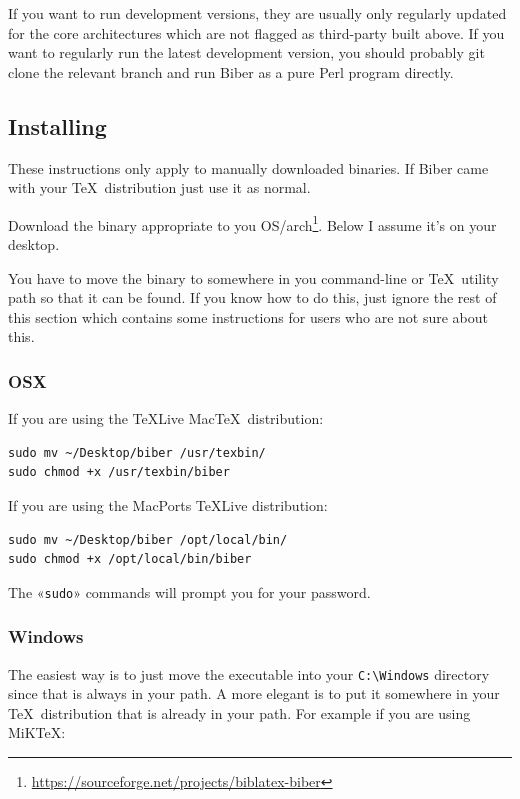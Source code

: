 \documentclass{ltxdockit}
\begin{document}
\noindent If you want to run development versions, they are usually only
regularly updated for the core architectures which are not flagged as
third-party built above. If you want to regularly run the latest
development version, you should probably git clone the relevant branch and
run Biber as a pure Perl program directly.

\subsection{Installing}

These instructions only apply to manually downloaded binaries. If
Biber came with your \TeX\ distribution just use it as normal.

Download the binary appropriate to you
OS/arch\footnote{\url{https://sourceforge.net/projects/biblatex-biber}}. Below
I assume it's on your desktop.

You have to move the binary to somewhere in you command-line or \TeX\ utility
path so that it can be found. If you know how to do this, just ignore the
rest of this section which contains some instructions for users who are
not sure about this.

\subsubsection{OSX}

If you are using the \TeX Live Mac\TeX\ distribution:

\begin{verbatim}
sudo mv ~/Desktop/biber /usr/texbin/
sudo chmod +x /usr/texbin/biber
\end{verbatim}

\noindent If you are using the MacPorts \TeX Live distribution:

\begin{verbatim}
sudo mv ~/Desktop/biber /opt/local/bin/
sudo chmod +x /opt/local/bin/biber
\end{verbatim}

\noindent The «\verb+sudo+» commands will prompt you for your password.

\subsubsection{Windows}

The easiest way is to just move the executable into your \verb+C:\Windows+ directory since
that is always in your path. A more elegant is to put it somewhere in
your \TeX\ distribution that is already in your path. For example if you
are using MiK\TeX:
\end{document}
